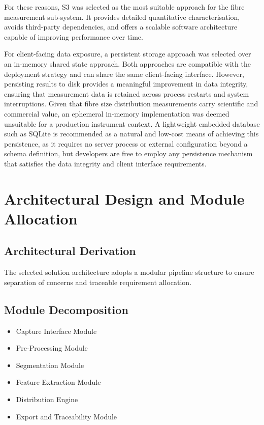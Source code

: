 \documentclass[11pt,a4paper]{article}
\begin{document}
For these reasons, S3 was selected as the most suitable approach for the fibre measurement sub-system. It provides detailed quantitative characterisation, avoids third-party dependencies, and offers a scalable software architecture capable of improving performance over time.

For client-facing data exposure, a persistent storage approach was selected over an in-memory shared state approach. Both approaches are compatible with the deployment strategy and can share the same client-facing interface. However, persisting results to disk provides a meaningful improvement in data integrity, ensuring that measurement data is retained across process restarts and system interruptions. Given that fibre size distribution measurements carry scientific and commercial value, an ephemeral in-memory implementation was deemed unsuitable for a production instrument context. A lightweight embedded database such as SQLite is recommended as a natural and low-cost means of achieving this persistence, as it requires no server process or external configuration beyond a schema definition, but developers are free to employ any persistence mechanism that satisfies the data integrity and client interface requirements.

\section{Architectural Design and Module Allocation}

\subsection{Architectural Derivation}

The selected solution architecture adopts a modular pipeline structure to ensure separation of concerns and traceable requirement allocation.

\subsection{Module Decomposition}

\begin{itemize}
    \item Capture Interface Module
    \item Pre-Processing Module
    \item Segmentation Module
    \item Feature Extraction Module
    \item Distribution Engine
    \item Export and Traceability Module
\end{itemize}
\end{document}
